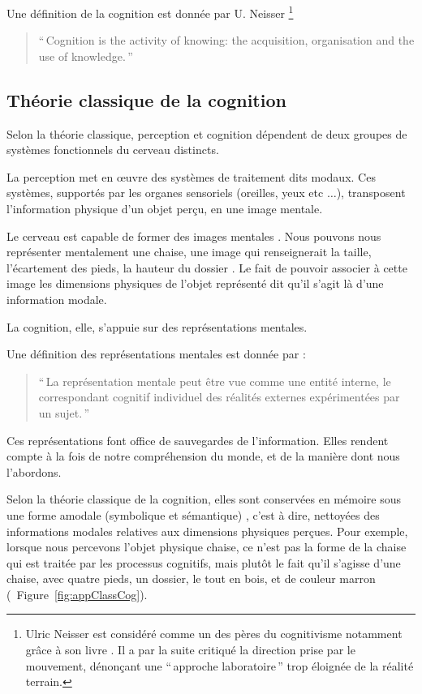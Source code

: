 Une définition de la cognition est donnée par U. Neisser \citep[p. 1]{neisser1976cognition}\footnote{Ulric Neisser est considéré comme un des pères du cognitivisme notamment grâce à son livre \citep{neisser1967cognitive}. Il a par la suite critiqué la direction prise par le mouvement, dénonçant une ``\,approche laboratoire\,'' trop éloignée de la réalité terrain.}

\begin{quote}
\item ``\,Cognition is the activity of knowing: the acquisition, organisation and the use of knowledge.\,''
\end{quote}

\subsection{Théorie classique de la cognition}
\label{sec:ch3_classicCognition}

Selon la théorie classique, perception et cognition dépendent de deux groupes de systèmes fonctionnels du cerveau distincts. 

La perception met en œuvre des systèmes de traitement dits modaux. Ces systèmes, supportés par les organes sensoriels (oreilles, yeux etc $\ldots$), transposent l'information physique d'un objet perçu, en une image mentale.

Le cerveau est capable de former des images mentales \citep{barsalou2003situated,martin2001functional}. Nous pouvons nous représenter mentalement une chaise, une image qui renseignerait la taille, l'écartement des pieds, la hauteur du dossier \etc. Le fait de pouvoir associer à cette image les dimensions physiques de l'objet représenté dit qu'il s'agit là d'une information modale.

La cognition, elle, s'appuie sur des représentations mentales.

Une définition des représentations mentales est donnée par \citep{houde1998vocabulaire}:

\begin{quote}
``\,La représentation mentale peut être vue comme une entité interne, le correspondant cognitif individuel des réalités externes expérimentées par un sujet.\,''
\end{quote}

Ces représentations font office de sauvegardes de l'information. Elles rendent compte à la fois de notre compréhension du monde, et de la manière dont nous l'abordons. 

Selon la théorie classique de la cognition, elles sont conservées en mémoire sous une forme amodale (symbolique et sémantique) \citep[p. 357]{mcadams1994penser}, c'est à dire, nettoyées des informations modales relatives aux dimensions physiques perçues. Pour exemple, lorsque nous percevons l'objet physique chaise, ce n'est pas la forme de la chaise qui est traitée par les processus cognitifs, mais plutôt le fait qu'il s'agisse d'une chaise, avec quatre pieds, un dossier, le tout en bois, et de couleur marron (\cf~Figure~\ref{fig:appClassCog}).
 
